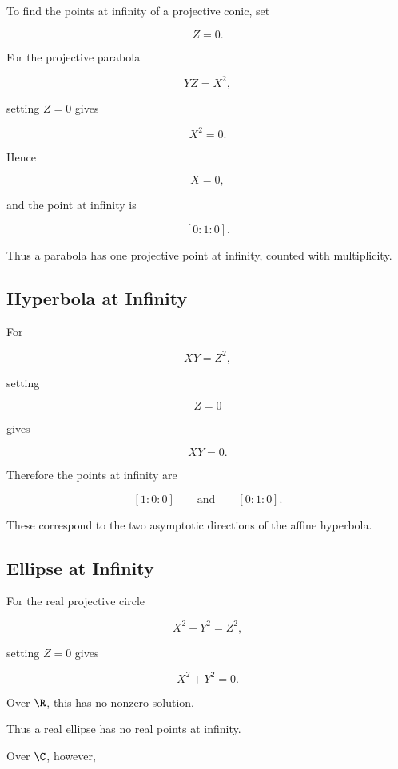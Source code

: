 To find the points at infinity of a projective conic, set

\[
Z=0.
\]

For the projective parabola

\[
YZ=X^2,
\]

setting \(Z=0\) gives

\[
X^2=0.
\]

Hence

\[
X=0,
\]

and the point at infinity is

\[
\boxed{[0:1:0].}
\]

Thus a parabola has one projective point at infinity, counted with
multiplicity.

\subsection{Hyperbola at Infinity}
\label{subsec:hyperbola-at-infinity}

For

\[
XY=Z^2,
\]

setting

\[
Z=0
\]

gives

\[
XY=0.
\]

Therefore the points at infinity are

\[
\boxed{
[1:0:0]
\qquad\text{and}\qquad
[0:1:0].
}
\]

These correspond to the two asymptotic directions of the affine hyperbola.

\subsection{Ellipse at Infinity}
\label{subsec:ellipse-at-infinity}

For the real projective circle

\[
X^2+Y^2=Z^2,
\]

setting \(Z=0\) gives

\[
X^2+Y^2=0.
\]

Over \(\R\), this has no nonzero solution.

Thus a real ellipse has no real points at infinity.

Over \(\C\), however,

